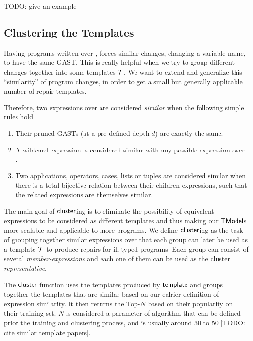 TODO: give an example

\subsection{Clustering the Templates}
\label{subsec:clustering}

Having programs written over \repairLang, forces similar changes, \ie changing a
variable name, to have the same GAST. This is really helpful when we try to
group different changes together into some templates $\mathcal{T}$. We want to extend and
generalize this ``similarity'' of program changes, in order to get a small but
generally applicable number of repair templates.

Therefore, two expressions over \repairLang are considered \emph{similar} when
the following simple rules hold:
\begin{enumerate}
    \item Their pruned GASTs (at a pre-defined depth $d$) are exactly the same.
    \item A wildcard expression is considered similar with any possible
    expression over \repairLang.
    \item Two applications, operators, cases, lists or tuples are considered
    similar when there is a total bijective relation between their children
    expressions, such that the related expressions are themselves similar.
\end{enumerate}


The main goal of $\mathsf{cluster}$ing is to eliminate the possibility of equivalent
expressions to be considered as different templates and thus making our
$\mathsf{TModel}$s more scalable and applicable to more programs. We define
$\mathsf{cluster}$ing as the task of grouping together similar expressions over
\repairLang that each group can later be used as a template $\mathcal{T}$ to produce
repairs for ill-typed programs. Each group can consist of several
\emph{member-expressions} and each one of them can be used as the cluster
\emph{representative}.

The $\mathsf{cluster}$ function uses the templates produced by $\mathsf{template}$ and
groups together the templates that are similar based on our ealrier definition
of expression similarity. It then returns the Top-$N$ based on their popularity
on their training set. $N$ is considered a parameter of algorithm that can be
defined prior the training and clustering process, and is usually around 30 to
50 [TODO: cite similar template papers].

